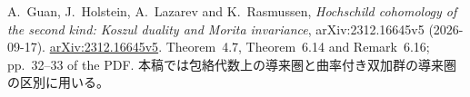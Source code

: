 A.~Guan, J.~Holstein, A.~Lazarev and K.~Rasmussen,
\emph{Hochschild cohomology of the second kind: Koszul duality and Morita invariance},
arXiv:2312.16645v5 (2026-09-17).
\href{https://arxiv.org/abs/2312.16645v5}{arXiv:2312.16645v5}.
Theorem~4.7, Theorem~6.14 and Remark~6.16; pp.~32--33 of the PDF.
本稿では包絡代数上の導来圏と曲率付き双加群の導来圏の区別に用いる。

